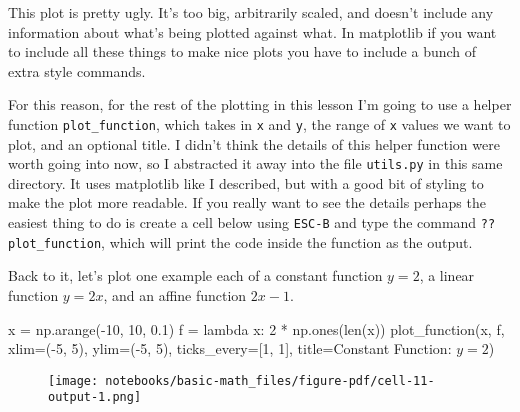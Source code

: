 \documentclass[
  letterpaper,
  DIV=11,
  numbers=noendperiod]{scrreprt}
\newenvironment{Shaded}{\begin{snugshade}}{\end{snugshade}}
\newcommand{\BuiltInTok}[1]{\textcolor[rgb]{0.00,0.23,0.31}{#1}}
\newcommand{\DecValTok}[1]{\textcolor[rgb]{0.68,0.00,0.00}{#1}}
\newcommand{\FloatTok}[1]{\textcolor[rgb]{0.68,0.00,0.00}{#1}}
\newcommand{\KeywordTok}[1]{\textcolor[rgb]{0.00,0.23,0.31}{#1}}
\newcommand{\NormalTok}[1]{\textcolor[rgb]{0.00,0.23,0.31}{#1}}
\newcommand{\OperatorTok}[1]{\textcolor[rgb]{0.37,0.37,0.37}{#1}}
\newcommand{\StringTok}[1]{\textcolor[rgb]{0.13,0.47,0.30}{#1}}
\begin{document}
This plot is pretty ugly. It's too big, arbitrarily scaled, and doesn't
include any information about what's being plotted against what. In
matplotlib if you want to include all these things to make nice plots
you have to include a bunch of extra style commands.

For this reason, for the rest of the plotting in this lesson I'm going
to use a helper function \texttt{plot\_function}, which takes in
\texttt{x} and \texttt{y}, the range of \texttt{x} values we want to
plot, and an optional title. I didn't think the details of this helper
function were worth going into now, so I abstracted it away into the
file \texttt{utils.py} in this same directory. It uses matplotlib like I
described, but with a good bit of styling to make the plot more
readable. If you really want to see the details perhaps the easiest
thing to do is create a cell below using \texttt{ESC-B} and type the
command \texttt{??plot\_function}, which will print the code inside the
function as the output.

Back to it, let's plot one example each of a constant function \(y=2\),
a linear function \(y=2x\), and an affine function \(2x-1\).

\begin{Shaded}
\begin{Highlighting}[]
\NormalTok{x }\OperatorTok{=}\NormalTok{ np.arange(}\OperatorTok{{-}}\DecValTok{10}\NormalTok{, }\DecValTok{10}\NormalTok{, }\FloatTok{0.1}\NormalTok{)}
\NormalTok{f }\OperatorTok{=} \KeywordTok{lambda}\NormalTok{ x: }\DecValTok{2} \OperatorTok{*}\NormalTok{ np.ones(}\BuiltInTok{len}\NormalTok{(x))}
\NormalTok{plot\_function(x, f, xlim}\OperatorTok{=}\NormalTok{(}\OperatorTok{{-}}\DecValTok{5}\NormalTok{, }\DecValTok{5}\NormalTok{), ylim}\OperatorTok{=}\NormalTok{(}\OperatorTok{{-}}\DecValTok{5}\NormalTok{, }\DecValTok{5}\NormalTok{), ticks\_every}\OperatorTok{=}\NormalTok{[}\DecValTok{1}\NormalTok{, }\DecValTok{1}\NormalTok{], }
\NormalTok{              title}\OperatorTok{=}\StringTok{\textquotesingle{}Constant Function: $y=2$\textquotesingle{}}\NormalTok{)}
\end{Highlighting}
\end{Shaded}

\begin{figure}[H]

{\centering \texttt{[image: notebooks/basic-math\_files/figure-pdf/cell-11-output-1.png]}

}

\end{figure}
\end{document}
